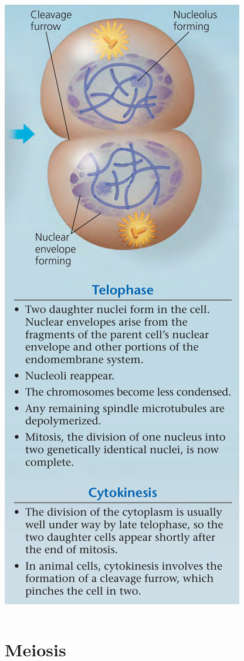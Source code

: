 \documentclass[11pt,ignorenonframetext,aspectratio=169]{beamer}
\begin{document}
\begin{frame}{}
\begin{columns}[T,onlytextwidth]
\begin{center}\includegraphics[width=0.64\linewidth]{../images/mitosis_animal_cell33} \end{center}

\end{columns}
\end{frame}

\hypertarget{meiosis}{%
\section{Meiosis}\label{meiosis}}
\end{document}
